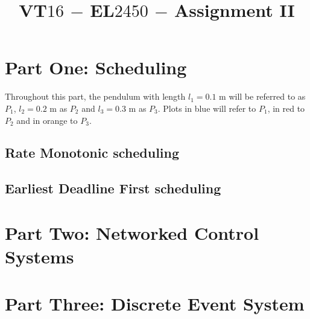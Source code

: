 \documentclass[oneside,12pt]{article}
\title{VT$16$ $-$ EL$2450$ $-$ Assignment II}
\author{
  \noindent\makebox[\textwidth][c]{
    \begin{minipage}{\linewidth}\centering
      \begin{minipage}{0.35\linewidth}\centering
        Alexandros Filotheou \\ 871108-5590 \\ alefil@kth.se
      \end{minipage}
      \begin{minipage}{0.35\linewidth}\centering
        Roberto Sanchez-Rey \\ 840616-9139\\ rosr@kth.se
      \end{minipage}
    \end{minipage}
  }}
\date{}
\begin{document}
	\maketitle

  \section{Part One: Scheduling}
    Throughout this part, the pendulum with length $l_1 = 0.1$ m will be
    referred to as $P_1$, $l_2 = 0.2$ m as $P_2$ and $l_3 = 0.3$ m as $P_3$.
    Plots in blue will refer to $P_1$, in red to $P_2$ and in orange to $P_3$.

  \subsection{Rate Monotonic scheduling}
    
    
    
    
    
    \newpage

  \subsection{Earliest Deadline First scheduling}
    
    
    
    
    
    
    \newpage

  \section{Part Two: Networked Control Systems}
    
    
    
    \newpage

  \section{Part Three: Discrete Event System}
    
    
    

  \newpage

  \appendix
  
\end{document}
